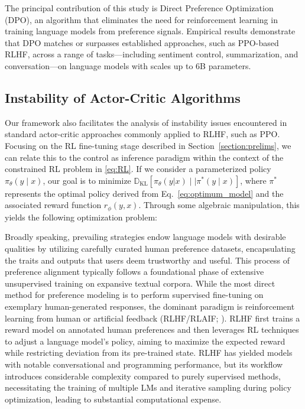 The principal contribution of this study is Direct Preference Optimization (DPO), an algorithm that eliminates the need for reinforcement learning in training language models from preference signals. Empirical results demonstrate that DPO matches or surpasses established approaches, such as PPO-based RLHF, across a range of tasks—including sentiment control, summarization, and conversation—on language models with scales up to 6B parameters.

\subsection{Instability of Actor-Critic Algorithms} Our framework also facilitates the analysis of instability issues encountered in standard actor-critic approaches commonly applied to RLHF, such as PPO. Focusing on the RL fine-tuning stage described in Section~\ref{section:prelims}, we can relate this to the control as inference paradigm \cite{levine2018reinforcement} within the context of the constrained RL problem in \ref{eq:RL}. If we consider a parameterized policy $\pi_{\theta}(y\mid x)$, our goal is to minimize $\mathbb{D}_{\text{KL}}[\pi_{\theta}(y|x) \mid \mid \pi^*(y\mid x)]$, where $\pi^*$ represents the optimal policy derived from Eq.~\ref{eq:optimum_model} and the associated reward function $r_{\phi}(y, x)$. Through some algebraic manipulation, this yields the following optimization problem:

Broadly speaking, prevailing strategies endow language models with desirable qualities by utilizing carefully curated human preference datasets, encapsulating the traits and outputs that users deem trustworthy and useful. This process of preference alignment typically follows a foundational phase of extensive unsupervised training on expansive textual corpora. While the most direct method for preference modeling is to perform supervised fine-tuning on exemplary human-generated responses, the dominant paradigm is reinforcement learning from human or artificial feedback (RLHF/RLAIF; \citep{christiano2017deep,bai2022constitutional}). RLHF first trains a reward model on annotated human preferences and then leverages RL techniques to adjust a language model’s policy, aiming to maximize the expected reward while restricting deviation from its pre-trained state. RLHF has yielded models with notable conversational and programming performance, but its workflow introduces considerable complexity compared to purely supervised methods, necessitating the training of multiple LMs and iterative sampling during policy optimization, leading to substantial computational expense.

